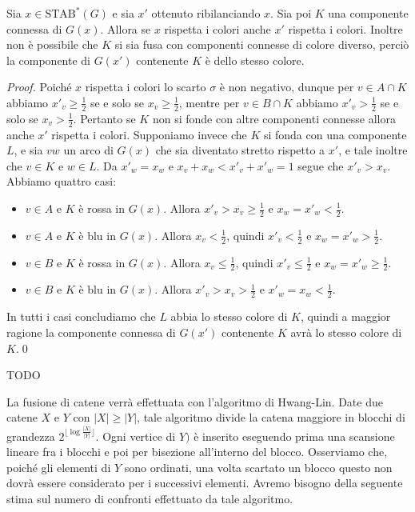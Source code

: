 \begin{lemma}
	\label{consistentlemma} Sia \(x\in\text{STAB}^{*}(G)\) e sia \(x'\) ottenuto ribilanciando \(x\). Sia poi \(K\) una componente connessa di \(G(x)\). Allora se \(x\) rispetta i colori anche \(x'\) rispetta i colori. Inoltre non è possibile che \(K\) si sia fusa con componenti connesse di colore diverso, perciò la componente di \(G(x')\) contenente \(K\) è dello stesso colore. 
\end{lemma}
\begin{proof}
	Poich\'e \(x\) rispetta i colori lo scarto \(\sigma\) \`e non negativo, dunque per \(v\in A\cap K\) abbiamo \(x'_v\ge \frac{1}{2}\) se e solo se \(x_v\ge \frac{1}{2}\), mentre per \(v\in B\cap K\) abbiamo \(x'_v>\frac{1}{2}\) se e solo se \(x_v>\frac{1}{2}\). Pertanto se \(K\) non si fonde con altre componenti connesse allora anche \(x'\) rispetta i colori. Supponiamo invece che \(K\) si fonda con una componente \(L\), e sia \(vw\) un arco di \(G(x)\) che sia diventato stretto rispetto a \(x'\), e tale inoltre che \(v\in K\) e \(w\in L\). Da \(x'_w=x_w\) e \(x_v+x_w < x'_v+x'_w = 1\) segue che \(x'_v > x_v\). Abbiamo quattro casi: 
	\begin{itemize}
		\item \(v\in A\) e \(K\) \`e rossa in \(G(x)\). Allora \(x'_v>x_v\ge\frac{1}{2}\) e \(x_w=x'_w<\frac{1}{2}\). 
		\item \(v\in A\) e \(K\) \`e blu in \(G(x)\). Allora \(x_v<\frac{1}{2}\), quindi \(x'_v<\frac{1}{2}\) e \(x_w=x'_w>\frac{1}{2}\). 
		\item \(v\in B\) e \(K\) \`e rossa in \(G(x)\). Allora \(x_v\le\frac{1}{2}\), quindi \(x'_v\le\frac{1}{2}\) e \(x_w=x'_w\ge\frac{1}{2}\). 
		\item \(v\in B\) e \(K\) \`e blu in \(G(x)\). Allora \(x'_v>x_v>\frac{1}{2}\) e \(x'_w=x_w<\frac{1}{2}\). 
	\end{itemize}
	In tutti i casi concludiamo che \(L\) abbia lo stesso colore di \(K\), quindi a maggior ragione la componente connessa di \(G(x')\) contenente \(K\) avr\`a lo stesso colore di \(K\).\qed 
\end{proof}
\begin{remark}
  TODO
\end{remark}
La fusione di catene verr\`a effettuata con l'algoritmo di Hwang-Lin. Date due catene \(X\) e \(Y\) con \(|X|\ge|Y|\), tale algoritmo divide la catena maggiore in blocchi di grandezza \(2^{\lfloor\log{\frac{|X|}{|Y|}}\rfloor}\). Ogni vertice di \(Y)\) \`e inserito eseguendo prima una scansione lineare fra i blocchi e poi per bisezione all'interno del blocco. Osserviamo che, poich\'e gli elementi di \(Y\) sono ordinati, una volta scartato un blocco questo non dovr\`a essere considerato per i successivi elementi. Avremo bisogno della seguente stima sul numero di confronti effettuato da tale algoritmo. 
